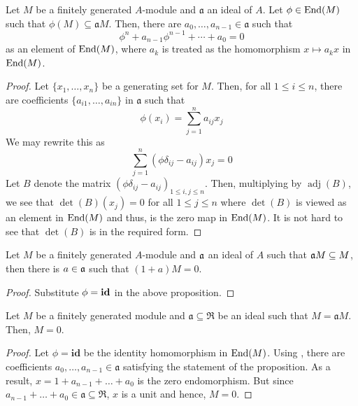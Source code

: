 \begin{proposition}
    Let $M$ be a finitely generated $A$-module and $\mathfrak a$ an ideal of $A$. Let $\phi\in\operatorname{End}(M)$ such that $\phi(M)\subseteq\mathfrak aM$. Then, there are $a_0,\ldots,a_{n - 1}\in\mathfrak a$ such that 
    \begin{equation*}
        \phi^n + a_{n - 1}\phi^{n - 1} + \cdots + a_0 = 0
    \end{equation*}
    as an element of $\operatorname{End}(M)$, where $a_k$ is treated as the homomorphism $x\mapsto a_kx$ in $\operatorname{End}(M)$.
\end{proposition}
\begin{proof}
    Let $\{x_1,\ldots,x_n\}$ be a generating set for $M$. Then, for all $1\le i\le n$, there are coefficients $\{a_{i1},\ldots,a_{in}\}$ in $\mathfrak a$ such that 
    \begin{equation*}
        \phi(x_i) = \sum_{j = 1}^n a_{ij}x_j
    \end{equation*}
    We may rewrite this as 
    \begin{equation*}
        \sum_{j = 1}^n(\phi\delta_{ij} - a_{ij})x_j = 0
    \end{equation*}
    Let $B$ denote the matrix $(\phi\delta_{ij} - a_{ij})_{1\le i,j\le n}$. Then, multiplying by $\operatorname{adj}(B)$, we see that $\det(B)(x_j) = 0$ for all $1\le j\le n$ where $\det(B)$ is viewed as an element in $\operatorname{End}(M)$ and thus, is the zero map in $\operatorname{End}(M)$. It is not hard to see that $\det(B)$ is in the required form.
\end{proof}

\begin{corollary}
    Let $M$ be a finitely generated $A$-module and $\mathfrak a$ an ideal of $A$ such that $\mathfrak a M\subseteq M$, then there is $a\in\mathfrak a$ such that $(1 + a)M = 0$.
\end{corollary}
\begin{proof}
    Substitute $\phi = \mathbf{id}$ in the above proposition.
\end{proof}

\begin{lemma}[Nakayama]
    Let $M$ be a finitely generated module and $\mathfrak a\subseteq\mathfrak R$ be an ideal such that $M = \mathfrak aM$. Then, $M = 0$. 
\end{lemma}
\begin{proof}
    Let $\phi = \mathbf{id}$ be the identity homomorphism in $\operatorname{End}(M)$. Using , there are coefficients $a_0,\ldots,a_{n - 1}\in\mathfrak a$ satisfying the statement of the proposition. As a result, $x = 1 + a_{n - 1} + \ldots + a_0$ is the zero endomorphism. But since $a_{n - 1} + \ldots + a_0\in\mathfrak a\subseteq\mathfrak R$, $x$ is a unit and hence, $M = 0$.
\end{proof}

